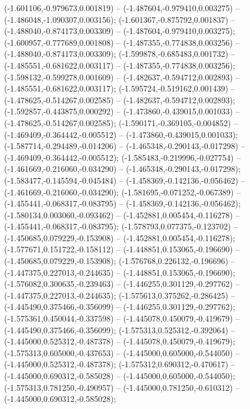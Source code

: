  (-1.601106,-0.979673,0.001819) -- (-1.487604,-0.979410,0.003275) -- (-1.486048,-1.090307,0.003156);
 (-1.601367,-0.875792,0.001837) -- (-1.488040,-0.874173,0.003309) -- (-1.487604,-0.979410,0.003275);
 (-1.600957,-0.777689,0.001808) -- (-1.487355,-0.774838,0.003256) -- (-1.488040,-0.874173,0.003309);
 (-1.599878,-0.685483,0.001732) -- (-1.485551,-0.681622,0.003117) -- (-1.487355,-0.774838,0.003256);
 (-1.598132,-0.599278,0.001609) -- (-1.482637,-0.594712,0.002893) -- (-1.485551,-0.681622,0.003117);
 (-1.595724,-0.519162,0.001439) -- (-1.478625,-0.514267,0.002585) -- (-1.482637,-0.594712,0.002893);
 (-1.592857,-0.443875,0.000292) -- (-1.473860,-0.439015,0.001033) -- (-1.478625,-0.514267,0.002585);
 (-1.590171,-0.369105,-0.004852) -- (-1.469409,-0.364442,-0.005512) -- (-1.473860,-0.439015,0.001033);
 (-1.587714,-0.294489,-0.014206) -- (-1.465348,-0.290143,-0.017298) -- (-1.469409,-0.364442,-0.005512);
 (-1.585483,-0.219996,-0.027754) -- (-1.461669,-0.216060,-0.034290) -- (-1.465348,-0.290143,-0.017298);
 (-1.583477,-0.145594,-0.045484) -- (-1.458369,-0.142136,-0.056462) -- (-1.461669,-0.216060,-0.034290);
 (-1.581695,-0.071252,-0.067389) -- (-1.455441,-0.068317,-0.083795) -- (-1.458369,-0.142136,-0.056462);
 (-1.580134,0.003060,-0.093462) -- (-1.452881,0.005454,-0.116278) -- (-1.455441,-0.068317,-0.083795);
 (-1.578793,0.077375,-0.123702) -- (-1.450685,0.079229,-0.153908) -- (-1.452881,0.005454,-0.116278);
 (-1.577671,0.151722,-0.158112) -- (-1.448851,0.153065,-0.196690) -- (-1.450685,0.079229,-0.153908);
 (-1.576768,0.226132,-0.196696) -- (-1.447375,0.227013,-0.244635) -- (-1.448851,0.153065,-0.196690);
 (-1.576082,0.300635,-0.239463) -- (-1.446255,0.301129,-0.297762) -- (-1.447375,0.227013,-0.244635);
 (-1.575613,0.375262,-0.286425) -- (-1.445490,0.375466,-0.356099) -- (-1.446255,0.301129,-0.297762);
 (-1.575361,0.450044,-0.337598) -- (-1.445078,0.450079,-0.419679) -- (-1.445490,0.375466,-0.356099);
 (-1.575313,0.525312,-0.392064) -- (-1.445000,0.525312,-0.487378) -- (-1.445078,0.450079,-0.419679);
 (-1.575313,0.605000,-0.437653) -- (-1.445000,0.605000,-0.544050) -- (-1.445000,0.525312,-0.487378);
 (-1.575312,0.690312,-0.470617) -- (-1.445000,0.690312,-0.585028) -- (-1.445000,0.605000,-0.544050);
 (-1.575313,0.781250,-0.490957) -- (-1.445000,0.781250,-0.610312) -- (-1.445000,0.690312,-0.585028);
